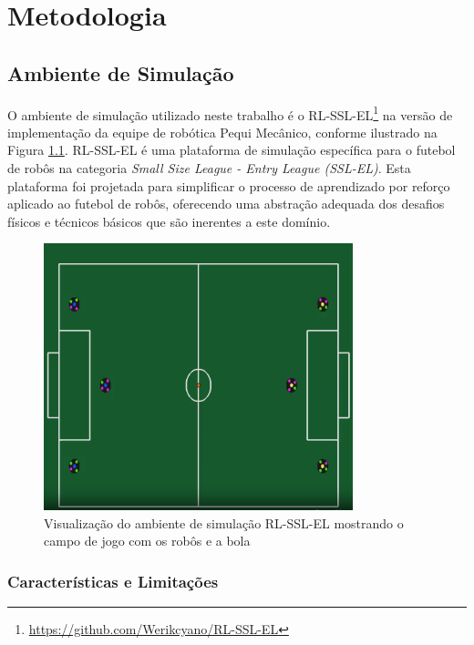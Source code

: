 \chapter{Metodologia}
\label{cap:metodologia}

\section{Ambiente de Simulação}
\label{sec:ambiente_simulacao}

O ambiente de simulação utilizado neste trabalho é o RL-SSL-EL\footnote{\url{https://github.com/Werikcyano/RL-SSL-EL}} na versão de implementação da equipe de robótica Pequi Mecânico, conforme ilustrado na Figura \ref{fig:campo_simulacao}. RL-SSL-EL é uma plataforma de simulação específica para o futebol de robôs na categoria \textit{Small Size League - Entry League (SSL-EL)}. Esta plataforma foi projetada para simplificar o processo de aprendizado por reforço aplicado ao futebol de robôs, oferecendo uma abstração adequada dos desafios físicos e técnicos básicos que são inerentes a este domínio.

\begin{figure}[h]
    \centering
    \includegraphics[width=0.8\textwidth]{fig/campo}
    \caption{Visualização do ambiente de simulação RL-SSL-EL mostrando o campo de jogo com os robôs e a bola}
    \label{fig:campo_simulacao}
\end{figure}

\subsection{Características e Limitações}

